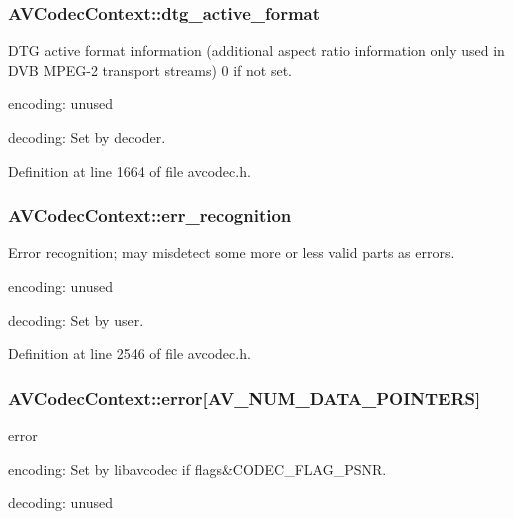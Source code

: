 \subsubsection[{\texorpdfstring{dtg\+\_\+active\+\_\+format}{dtg_active_format}}]{ A\+V\+Codec\+Context\+::dtg\+\_\+active\+\_\+format}\hypertarget{struct_a_v_codec_context_abd3a0bbdc42a993a83222a79ea08b6de}{}\label{struct_a_v_codec_context_abd3a0bbdc42a993a83222a79ea08b6de}
D\+TG active format information (additional aspect ratio information only used in D\+VB M\+P\+E\+G-\/2 transport streams) 0 if not set.


\begin{DoxyItemize}
\item encoding\+: unused
\item decoding\+: Set by decoder. 
\end{DoxyItemize}

Definition at line 1664 of file avcodec.\+h.

\subsubsection[{\texorpdfstring{err\+\_\+recognition}{err_recognition}}]{ A\+V\+Codec\+Context\+::err\+\_\+recognition}\hypertarget{struct_a_v_codec_context_af9978d9bd6ac80a494ef1b78fe1d004f}{}\label{struct_a_v_codec_context_af9978d9bd6ac80a494ef1b78fe1d004f}
Error recognition; may misdetect some more or less valid parts as errors.
\begin{DoxyItemize}
\item encoding\+: unused
\item decoding\+: Set by user. 
\end{DoxyItemize}

Definition at line 2546 of file avcodec.\+h.

\subsubsection[{\texorpdfstring{error}{error}}]{ A\+V\+Codec\+Context\+::error\mbox{[}{\bf A\+V\+\_\+\+N\+U\+M\+\_\+\+D\+A\+T\+A\+\_\+\+P\+O\+I\+N\+T\+E\+RS}\mbox{]}}\hypertarget{struct_a_v_codec_context_acb7a609f77fd8876c8433c3673e9f9d5}{}\label{struct_a_v_codec_context_acb7a609f77fd8876c8433c3673e9f9d5}
error
\begin{DoxyItemize}
\item encoding\+: Set by libavcodec if flags\&C\+O\+D\+E\+C\+\_\+\+F\+L\+A\+G\+\_\+\+P\+S\+NR.
\item decoding\+: unused 
\end{DoxyItemize}

